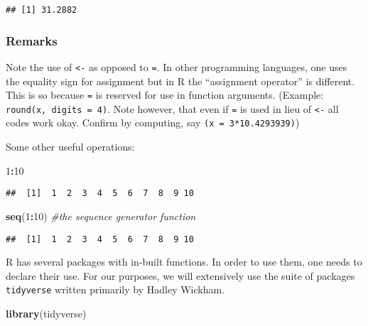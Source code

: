 \documentclass[12pt,]{article}
\newenvironment{Shaded}{\begin{snugshade}}{\end{snugshade}}
\newcommand{\KeywordTok}[1]{\textcolor[rgb]{0.13,0.29,0.53}{\textbf{#1}}}
\newcommand{\DecValTok}[1]{\textcolor[rgb]{0.00,0.00,0.81}{#1}}
\newcommand{\CommentTok}[1]{\textcolor[rgb]{0.56,0.35,0.01}{\textit{#1}}}
\newcommand{\OperatorTok}[1]{\textcolor[rgb]{0.81,0.36,0.00}{\textbf{#1}}}
\newcommand{\NormalTok}[1]{#1}
\begin{document}
\begin{verbatim}
## [1] 31.2882
\end{verbatim}

\subsubsection{Remarks}\label{remarks}

Note the use of \texttt{\textless{}-} as opposed to \texttt{=}. In other
programming languages, one uses the equality sign for assignment but in
R the ``assignment operator'' is different. This is so because
\texttt{=} is reserved for use in function arguments. (Example:
\texttt{round(x,\ digits\ =\ 4)}. Note however, that even if \texttt{=}
is used in lieu of \texttt{\textless{}-} all codes work okay. Confirm by
computing, say \texttt{(x\ =\ 3*10.4293939)})

Some other useful operations:

\begin{Shaded}
\begin{Highlighting}[]
\DecValTok{1}\OperatorTok{:}\DecValTok{10}
\end{Highlighting}
\end{Shaded}

\begin{verbatim}
##  [1]  1  2  3  4  5  6  7  8  9 10
\end{verbatim}

\begin{Shaded}
\begin{Highlighting}[]
\KeywordTok{seq}\NormalTok{(}\DecValTok{1}\OperatorTok{:}\DecValTok{10}\NormalTok{) }\CommentTok{#the sequence generator function}
\end{Highlighting}
\end{Shaded}

\begin{verbatim}
##  [1]  1  2  3  4  5  6  7  8  9 10
\end{verbatim}

R has several packages with in-built functions. In order to use them,
one needs to declare their use. For our purposes, we will extensively
use the suite of packages \texttt{tidyverse} written primarily by Hadley
Wickham.

\begin{Shaded}
\begin{Highlighting}[]
\KeywordTok{library}\NormalTok{(tidyverse)}
\end{Highlighting}
\end{Shaded}
\end{document}
